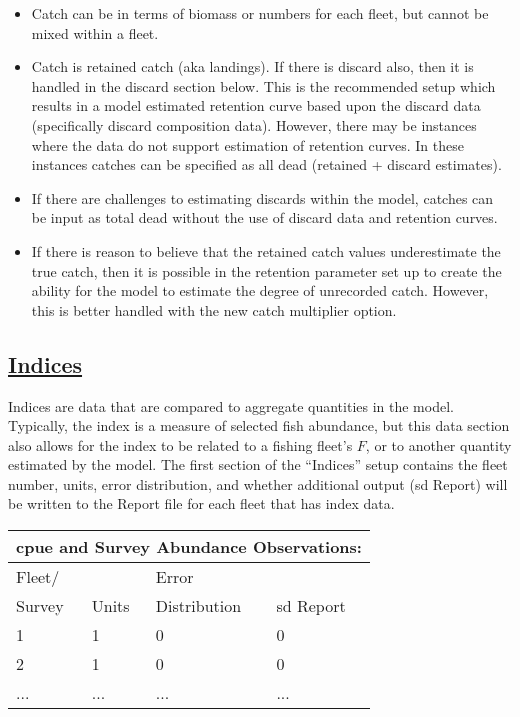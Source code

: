 \begin{itemize}
	\item Catch can be in terms of biomass or numbers for each fleet, but cannot be mixed within a fleet.
	\item Catch is retained catch (aka landings). If there is discard also, then it is handled in the discard section below. This is the recommended setup which results in a model estimated retention curve based upon the discard data (specifically discard composition data). However, there may be instances where the data do not support estimation of retention curves. In these instances catches can be specified as all dead (retained + discard estimates).
	\item If there are challenges to estimating discards within the model, catches can be input as total dead without the use of discard data and retention curves.
	\item If there is reason to believe that the retained catch values underestimate the true catch, then it is possible in the retention parameter set up to create the ability for the model to estimate the degree of unrecorded catch. However, this is better handled with the new catch multiplier option.
\end{itemize}

\hypertarget{Indices}{}
\subsection[Indices]{\protect\hyperlink{Indices}{Indices}}
Indices are data that are compared to aggregate quantities in the model. Typically, the index is a measure of selected fish abundance, but this data section also allows for the index to be related to a fishing fleet's $F$, or to another quantity estimated by the model. The first section of the ``Indices'' setup contains the fleet number, units, error distribution, and whether additional output (\gls{sd} Report) will be written to the Report file for each fleet that has index data.

\begin{center}
	\begin{tabular}{p{3cm} p{3cm} p{4cm} p{4cm}}
		\multicolumn{4}{l}{\gls{cpue} and Survey Abundance Observations:} \\
		\hline
		Fleet/ &       & Error        & \Tstrut\\
		Survey & Units & Distribution & \gls{sd} Report \Bstrut\\
		\hline
		1 & 1 & 0 & 0 \Tstrut\\
		2 & 1 & 0 & 0 \\
		... & ... & ... & ... \Bstrut\\
		\hline
	\end{tabular}		
\end{center}


